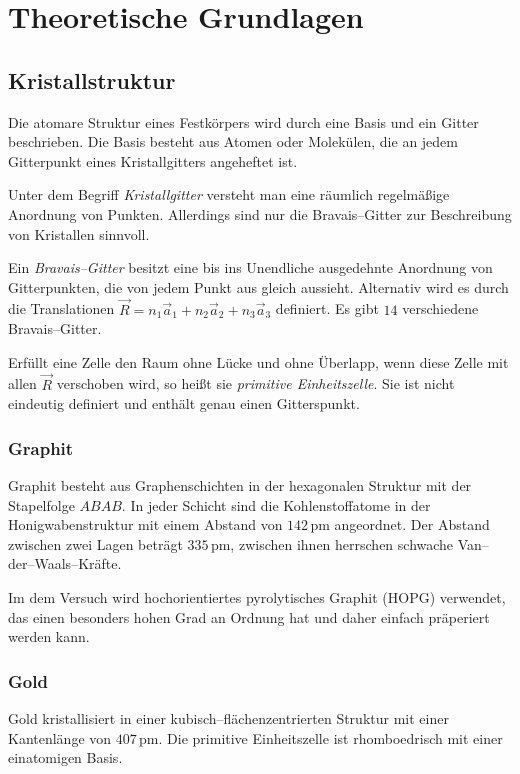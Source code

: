 \documentclass[12pt,a4paper]{scrartcl}
\numberwithin{equation}{section} %
\begin{document}
\clearpage
\hypertarget{theoretische-grundlagen}{%
\section{Theoretische Grundlagen}\label{theoretische-grundlagen}}

\hypertarget{kristallstruktur}{%
\subsection{Kristallstruktur}\label{kristallstruktur}}
Die atomare Struktur eines Festkörpers wird durch eine Basis und ein Gitter beschrieben. Die Basis besteht aus Atomen oder Molekülen, die an jedem Gitterpunkt eines Kristallgitters angeheftet ist.

Unter dem Begriff \textit{Kristallgitter} versteht man eine räumlich regelmäßige Anordnung von Punkten. Allerdings sind nur die Bravais--Gitter zur Beschreibung von Kristallen sinnvoll.

Ein \textit{Bravais--Gitter} besitzt eine bis ins Unendliche ausgedehnte Anordnung von Gitterpunkten, die von jedem Punkt aus gleich aussieht. Alternativ wird es durch die Translationen $\vec{R} = n_1\vec{a}_1 + n_2\vec{a}_2 + n_3\vec{a}_3$ definiert. Es gibt $14$ verschiedene Bravais--Gitter.

Erfüllt eine Zelle den Raum ohne Lücke und ohne Überlapp, wenn diese Zelle mit allen $\vec{R}$
verschoben wird, so heißt sie \textit{primitive Einheitszelle}. Sie ist nicht eindeutig definiert und enthält genau einen Gitterspunkt.

\hypertarget{graphitstruktur}{%
\subsubsection{Graphit}\label{graphitstruktur}}
Graphit besteht aus Graphenschichten in der hexagonalen Struktur mit der Stapelfolge $ABAB$. In jeder Schicht sind die Kohlenstoffatome in der Honigwabenstruktur mit einem Abstand von $142\mathrm{\,pm}$ angeordnet. Der Abstand zwischen zwei Lagen beträgt $335\mathrm{\,pm}$, zwischen ihnen herrschen schwache Van--der--Waals--Kräfte.

Im dem Versuch wird hochorientiertes pyrolytisches Graphit (HOPG) verwendet, das einen besonders hohen Grad an Ordnung hat und daher einfach präperiert werden kann.

\hypertarget{goldstruktur}{%
\subsubsection{Gold}\label{goldstruktur}}
Gold kristallisiert in einer kubisch--flächenzentrierten Struktur mit einer Kantenlänge von $407\mathrm{\,pm}$. Die primitive Einheitszelle ist rhomboedrisch mit einer einatomigen Basis.
\end{document}
